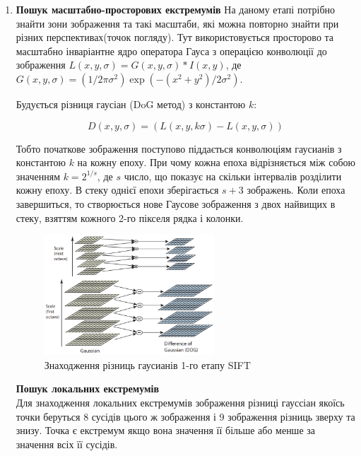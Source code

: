 \begin{enumerate}
    \item \textbf{Пошук масштабно-просторових екстремумів}
        На даному етапі потрібно знайти зони зображення та такі масштаби, які можна повторно 
        знайти при різних перспективах(точок погляду). Тут використовується просторово та 
        масштабно інваріантне ядро оператора Гауса з операцією конволюції 
        до зображення $L(x,y,\sigma) = G(x,y,\sigma) \ast I(x,y)$, 
        де $G(x,y,\sigma) = (1/2\pi\sigma^2)\exp({-(x^2+y^2)/2\sigma^2})$.


        Будується різниця гаусіан (DoG метод) з константою $k$:

        \begin{equation}
            D(x,y,\sigma) = (L(x,y,k\sigma) - L(x,y,\sigma))
        \end{equation}

        Тобто початкове зображення поступово піддається конволюціям гаусианів з константою
        $k$ на кожну епоху. При чому кожна епоха відрізняється між собою значенням $k = 2^{1/s}$,
        де $s$ число, що показує на скільки інтервалів розділити кожну епоху.
        В стеку однієї епохи зберігається $s+3$ зображень. Коли епоха завершиться, то
        створюється нове Гаусове зображення з двох найвищих в стеку,
        взяттям кожного 2-го пікселя рядка і колонки.  

        \begin{figure}[H]
            \centering
            \includegraphics[width=0.6\textwidth]{images/sift1}
            \caption{Знаходження різниць гаусианів 1-го етапу SIFT}
            \label{fig:swift1}
        \end{figure}

        \subitem \textbf{Пошук локальних екстремумів} \\
                Для знаходження локальних екстремумів зображення різниці гауссіан 
                якоїсь точки беруться 8 сусідів цього ж зображення і 9 зображення різниць 
                зверху та знизу. Точка є екстремум якщо вона значення її більше або менше за 
                значення всіх її сусідів.


\end{enumerate}
